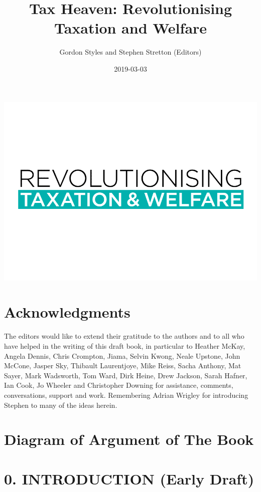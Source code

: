 \documentclass[]{tufte-handout}
\title{Tax Heaven: Revolutionising Taxation and Welfare}
\author{Gordon Styles and Stephen Stretton (Editors)}
\date{2019-03-03}
\begin{document}
\maketitle




\newpage

\includegraphics{OtherPictures/RTW.png}

\hypertarget{acknowledgments}{%
\section{Acknowledgments}\label{acknowledgments}}

The editors would like to extend their gratitude to the authors and to
all who have helped in the writing of this draft book, in particular to
Heather McKay, Angela Dennis, Chris Crompton, Jiama, Selvin Kwong, Neale
Upstone, John McCone, Jasper Sky, Thibault Laurentjoye, Mike Reiss,
Sacha Anthony, Mat Sayer, Mark Wadsworth, Tom Ward, Dirk Heine, Drew
Jackson, Sarah Hafner, Ian Cook, Jo Wheeler and Christopher Downing for
assistance, comments, conversations, support and work. Remembering
Adrian Wrigley for introducing Stephen to many of the ideas herein.

\hypertarget{diagram-of-argument-of-the-book}{%
\section{Diagram of Argument of The
Book}\label{diagram-of-argument-of-the-book}}

\newpage

\hypertarget{introduction-early-draft}{%
\section{0. INTRODUCTION (Early Draft)}\label{introduction-early-draft}}
\end{document}
